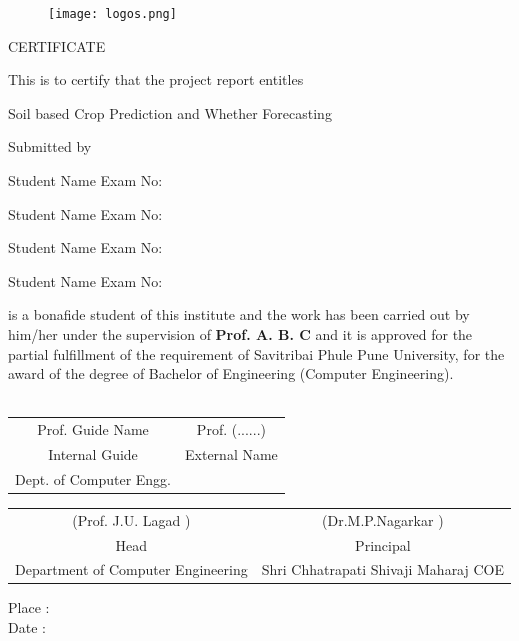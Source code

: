 \documentclass[oneside,a4paper,12pt]{report}
\begin{document}
\newpage



\begin{figure}[ht]
\centering
\texttt{[image: logos.png]}
\end{figure}

{\bfseries \fontsize{16}{12} \selectfont \centerline{CERTIFICATE} 
\vspace*{2\baselineskip}} 

\centerline{This is to certify that the project report entitles}
\vspace*{1\baselineskip} 


{\bfseries \fontsize{14}{12} \selectfont \centerline{Soil based Crop Prediction 		 and Whether Forecasting}
\vspace*{1\baselineskip}}

\centerline{Submitted by}
\vspace*{1\baselineskip} 
\centerline{Student Name  \hspace{25 mm} Exam No: } 
\centerline{Student Name \hspace{25 mm} Exam No:  } 
\centerline{Student Name \hspace{25 mm} Exam No: }
\centerline{Student Name \hspace{25 mm} Exam No: }

is a bonafide student of this institute and the work has been carried out by him/her under the supervision of  \textbf{Prof. A. B. C} and it is approved for the partial fulfillment of the requirement of Savitribai Phule Pune University, for the award of the degree of Bachelor of Engineering (Computer Engineering). \\\\

\bgroup
\def\arraystretch{0.7}
\begin{tabular}{c c }
Prof. Guide Name &  \hspace{60 mm} Prof. (......)  \\								
Internal Guide   &  \hspace{60 mm}External Name  \\
Dept. of Computer Engg.  &	\hspace{50 mm}\\

\end{tabular}



\vspace*{2\baselineskip}
\bgroup
\def\arraystretch{0.4}
\begin{tabular}{c c }
(Prof. J.U. Lagad )  &  \hspace{25 mm} (Dr.M.P.Nagarkar )   \\						 Head  &  \hspace{25 mm} Principal \\
Department of Computer Engineering &	\hspace{25 mm}Shri Chhatrapati Shivaji Maharaj COE   \\
\end{tabular}
\vspace*{0\baselineskip}
\item Place :\\
Date :
\end{document}
